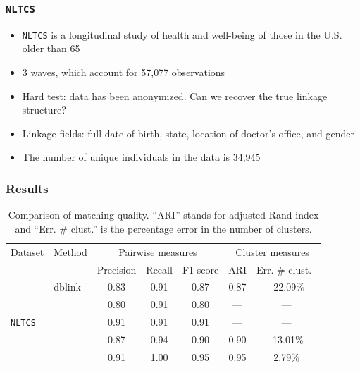 \documentclass[9pt]{beamer}
\begin{document}
\addtocounter{framenumber}{-1}


\begin{frame}
\frametitle{\texttt{NLTCS}}
 
\begin{itemize}
\item \texttt{NLTCS} is a longitudinal study of health and well-being of those in the U.S. older than 65
\vfill
\item 3 waves, which account for 57,077 observations
\vfill
\item Hard test: data has been anonymized. Can we recover the true linkage structure?
\vfill
\item Linkage fields: full date of birth, state, location of doctor's office, and gender
\vfill
\item The number of unique individuals in the data is 34,945
\end{itemize}
 
\end{frame}

\begin{frame}
\frametitle{Results }
 
 \begin{table}[h!]
	\centering
	\caption{Comparison of matching quality.
		``ARI'' stands for adjusted Rand index and ``Err. \# clust.'' 
		is the percentage error in the number of clusters.}
	\label{tbl:linkage-quality-real}
	\footnotesize
	\begin{tabular}{l l *{5}{c}}
		\toprule
		Dataset    & Method & \multicolumn{3}{c}{Pairwise measures} & \multicolumn{2}{c}{Cluster measures} \\
		\cmidrule(lr){3-5} \cmidrule(lr){6-7}
		& & Precision & Recall & F1-score & ARI & Err. \# clust.\ \\
		\midrule
		\multirow{5}{*}{\texttt{NLTCS}}
		& dblink              & 0.83 & 0.91 & 0.87 & 0.87 & --22.09\% \\
		& \fLL   &  0.80	& 0.91	& 0.80 & --- & --- \\
		& \fLS   & 0.91 &	0.91	& 0.91 & --- & --- \\
		& \fLdbL  &     0.87 & 0.94 & 0.90 & 0.90 & -13.01\% \\
		& \fLdbS    &   0.91  & 1.00 & 0.95 & 0.95 & 2.79\% \\
		\bottomrule
	\end{tabular}
\end{table}

 
\end{frame}
\end{document}
